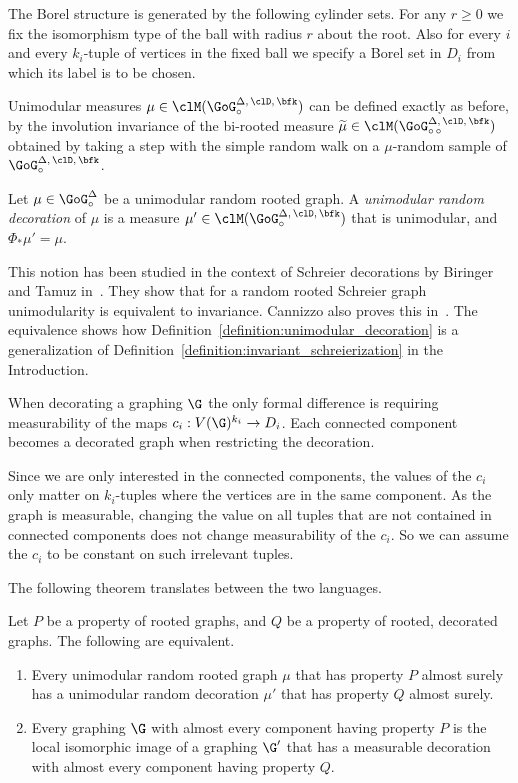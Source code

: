 The Borel structure is generated by the following cylinder sets. For any $r \geq 0$ we fix the isomorphism type of the ball with radius $r$ about the root. Also for every $i$ and every $k_i$-tuple of vertices in the fixed ball we specify a Borel set in $D_i$ from which its label is to be chosen.

Unimodular measures $\mu \in \clM(\GoG_{\circ}^{\Delta,\,\clD,\,\bfk})$ can be defined exactly as before, by the involution invariance of the bi-rooted measure $\widetilde{\mu} \in \clM(\GoG_{\circ\,\circ}^{\Delta,\,\clD,\,\bfk})$ obtained by taking a step with the simple random walk on a $\mu$-random sample of $\GoG_{\circ}^{\Delta,\,\clD,\,\bfk}$.

\begin{defi}\label{definition:unimodular_decoration}
Let $\mu \in \GoG_{\circ}^{\Delta}$ be a unimodular random rooted graph. A \emph{unimodular random decoration} of $\mu$ is a measure $\mu' \in \clM(\GoG_{\circ}^{\Delta,\,\clD,\,\bfk})$ that is unimodular, and $\Phi_{*}\mu' = \mu$.
\end{defi}

This notion has been studied in the context of Schreier decorations by Biringer and Tamuz in~\cite{biringer2017unimodularity}. They show that for a random rooted Schreier graph unimodularity is equivalent to invariance. Cannizzo also proves this in~\cite{cannizzo2013invariant}. The equivalence shows how Definition~\ref{definition:unimodular_decoration} is a generalization of Definition~\ref{definition:invariant_schreierization} in the Introduction.

When decorating a graphing $\G$ the only formal difference is requiring measurability of the maps $c_i:V(\G)^{k_i} \to D_i$. Each connected component becomes a decorated graph when restricting the decoration.

Since we are only interested in the connected components, the values of the $c_i$ only matter on $k_i$-tuples where the vertices are in the same component. As the graph is measurable, changing the value on all tuples that are not contained in connected components does not change measurability of the $c_i$. So we can assume the $c_i$ to be constant on such irrelevant tuples.

The following theorem translates between the two languages.

\begin{theo}\label{theorem:translation}
Let $P$ be a property of rooted graphs, and $Q$ be a property of rooted, decorated graphs. The following are equivalent.
\begin{enumerate}\romanenumi
\item\label{theo6.3.1} Every unimodular random rooted graph $\mu$ that has property $P$ almost surely has a unimodular random decoration $\mu'$ that has property $Q$ almost surely.
\item\label{theo6.3.2} Every graphing $\G$ with almost every component having property $P$ is the local isomorphic image of a graphing $\G'$ that has a measurable decoration with almost every component having property $Q$.
\end{enumerate}
\end{theo}

